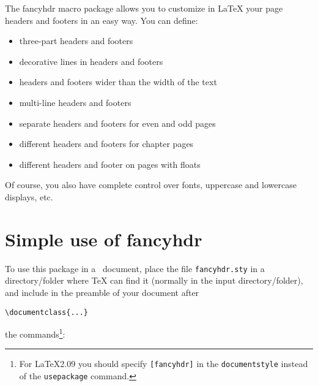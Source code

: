 \documentclass[a4paper]{article}
\makeatletter
\def\latex/{\protect\LaTeX{}}
\def\tex/{\TeX}
\newcommand{\bs}{\symbol{'134}}
\newcommand{\Cmd}[1]{\texttt{\def\{{\char`\{}\def\}{\char`\}}\bs#1}}
\newcommand{\TTindex}[1]{\index{#1@\texttt{#1}}}
\makeatother
\begin{document}
The \textsf{fancyhdr} macro package allows you to customize
in \latex/ your page headers and footers in an easy way.  You can
define:
\begin{itemize}
\item three-part headers and footers
\item decorative lines in headers and footers
\item headers and footers wider than the width of the text
\item multi-line headers and footers
\item separate headers and footers for even and odd pages
\item different headers and footers for chapter pages
\item different headers and footer on pages with floats
\end{itemize}

Of course, you also have complete control over fonts, uppercase
and lowercase displays, etc.



\section{Simple use of \textsf{fancyhdr}}  To use this package in a
\LaTeXe\ document, place the file \verb|fancyhdr.sty| in a
directory/folder where \tex/ can find it (normally in the input
directory/folder), and include in the preamble of your document
after

\begin{verbatim}
\documentclass{...}
\end{verbatim}
the commands\footnote{For LaTeX2.09 you should specify \texttt{[fancyhdr]}
  in the \Cmd{documentstyle} instead of the \Cmd{usepackage}
  command.}: 
\end{document}
